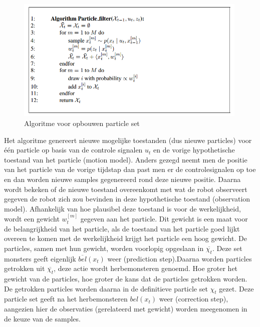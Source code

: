 \documentclass{book}
\begin{document}
\begin{figure}[H]
\centering
\includegraphics[width = 0.99\textwidth]{algoritmePF.png}
\caption{Algoritme voor opbouwen particle set}
\label{algoritmePF}
\end{figure}


Het algoritme genereert nieuwe mogelijke toestanden (dus nieuwe particles) voor één particle op basis van de controle signalen $u_{t}$ en de vorige hypothetische toestand van het particle (motion model). Anders gezegd neemt men de positie van het particle van de vorige tijdstap dan past men er de controlesignalen op toe en dan worden nieuwe samples gegenereerd rond deze nieuwe positie.
Daarna wordt bekeken of de nieuwe toestand overeenkomt met wat de robot observeert gegeven de robot zich zou bevinden in deze hypothetische toestand (observation model). Afhankelijk van hoe plausibel deze toestand is voor de werkelijkheid, wordt een gewicht $w_{t}^{[m]}$ gegeven aan het particle. Dit gewicht is een maat voor de belangrijkheid van het particle, als de toestand van het particle goed lijkt overeen te komen met de werkelijkheid krijgt het particle een hoog gewicht.
De particles, samen met hun gewicht, worden voorlopig opgeslaan in $\overline{\chi_{t}}$. Deze set monsters geeft eigenlijk $\overline{bel}(x_t)$ weer (prediction step).Daarna worden particles getrokken uit  $\overline{\chi_{t}}$, deze actie wordt herbemonsteren genoemd. Hoe groter het gewicht van de particles, hoe groter de kans dat de particles getrokken worden. De getrokken particles worden daarna in de definitieve particle set $\chi_{t}$ gezet. Deze particle set geeft na het herbemonsteren $bel(x_{t})$ weer (correction step), aangezien hier de observaties (gerelateerd met gewicht) worden meegenomen in de keuze van de samples.
\end{document}

